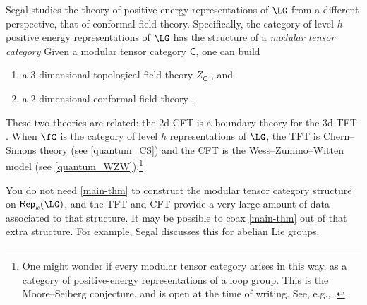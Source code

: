 \begin{remark}
Segal \cite{segal-book} studies the theory of positive energy representations of $\LG$ from a different
perspective, that of conformal field theory. Specifically, the category
of level $h$ positive energy representations of $\LG$ has the structure of a \textit{modular tensor
category} Given a modular tensor category $\mathsf C$, one can build
\begin{enumerate}[(1)]
	\item a $3$-dimensional topological field theory $Z_{\mathsf C}$ \cite{RT90, RT91, Wal91, BK01, KL01, BDSV15},
	and
	\item a $2$-dimensional conformal field theory \cite{MS89}.
\end{enumerate}
These two theories are related: the 2d CFT is a boundary theory for the 3d TFT \cite{Wit89, FT12}. When $\fC$ is
the category of level $h$ representations of $\LG$, the TFT is Chern--Simons theory (see \cref{quantum_CS}) and the
CFT is the Wess--Zumino--Witten model (see \cref{quantum_WZW}).\footnote{One might wonder if every modular tensor
category arises in this way, as a category of positive-energy representations of a loop group. This is the
Moore--Seiberg conjecture, and is open at the time of writing. See,
e.g., \cite{HRW08}.}

You do not need \cref{main-thm} to construct the modular tensor category structure on $\mathsf{Rep}_k(\LG)$, and
the TFT and CFT provide a very large amount of data associated to that structure. It may be possible to coax
\cref{main-thm} out of that extra structure. For example, Segal \cite[\S 12]{segal-book} discusses this for abelian
Lie groups.
\end{remark}
%
